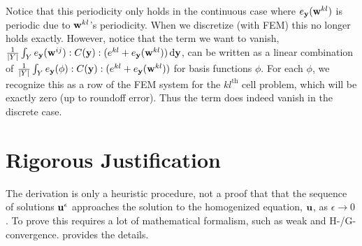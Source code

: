 \documentclass[10pt]{article}
\providecommand{\e}{\epsilon}
\begin{document}
Notice that this periodicity only holds
in the continuous case where $e_{\bf y}({\bf w}^{kl})$ is periodic due to ${\bf
w}^{kl}$'s periodicity. When we discretize (with FEM) this no longer holds exactly.
However, notice that the term we want to vanish,
$ \frac{1}{|Y|} \int_Y e_{\bf y}({\bf w}^{ij}) : C({\bf y}) : (e^{kl} + e_{\bf y}({\bf w}^{kl})) \,
\mathrm{d} {\bf y}$, can be written as a linear combination of
$ \frac{1}{|Y|} \int_Y e_{\bf y}(\phi) : C({\bf y}) : (e^{kl} + e_{\bf y}({\bf
w}^{kl})) $
for basis functions $\phi$. For each $\phi$, we recognize this as a row of the
FEM system for the $kl^\text{th}$ cell problem, which will be exactly zero (up
to roundoff error). Thus the term does indeed vanish in the discrete case.

\section{Rigorous Justification}
The derivation is only a heuristic procedure, not a proof that that the
sequence of solutions ${\bf u}^\e$ approaches the solution to the
homogenized equation, ${\bf u}$, as $\e \to 0$ . To prove this requires a lot of mathematical
formalism, such as weak and H-/G-convergence. \cite{allaire2002shape} provides the details.
\end{document}
